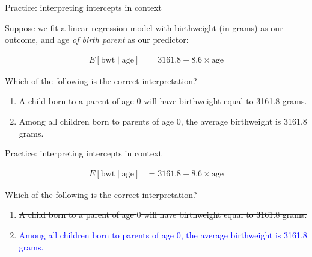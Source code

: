 \documentclass[10pt,t]{beamer}
\begin{document}
\begin{frame}{Practice: interpreting intercepts in context}

Suppose we fit a linear regression model with birthweight (in grams) as our outcome, and age \textit{of birth parent} as our predictor:

\begin{align*}
E[\text{bwt} \mid \text{age}] & = 3161.8 + 8.6 \times \text{age}
\end{align*}

Which of the following is the correct interpretation?

\begin{enumerate}
	\item A child born to a parent of age $0$ will have birthweight equal to 3161.8 grams.
	\item Among all children born to parents of age $0$, the average birthweight is 3161.8 grams.
\end{enumerate}
\end{frame}

\begin{frame}{Practice: interpreting intercepts in context}


\begin{align*}
E[\text{bwt} \mid \text{age}] & = 3161.8 + 8.6 \times \text{age}
\end{align*}

Which of the following is the correct interpretation?

\vspace{0.3cm}

\begin{enumerate}
	\item \sout{A child born to a parent of age $0$ will have birthweight equal to 3161.8 grams.}
	\item \textcolor{blue}{Among all children born to parents of age $0$, the average birthweight is 3161.8 grams.}
\end{enumerate}

\end{frame}
\end{document}

